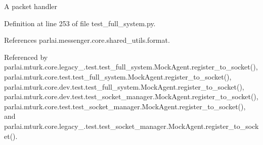 \begin{DoxyVerb}A packet handler\end{DoxyVerb}
 

Definition at line 253 of file test\+\_\+full\+\_\+system.\+py.



References parlai.\+messenger.\+core.\+shared\+\_\+utils.\+format.



Referenced by parlai.\+mturk.\+core.\+legacy\+\_.\+test.\+test\+\_\+full\+\_\+system.\+Mock\+Agent.\+register\+\_\+to\+\_\+socket(), parlai.\+mturk.\+core.\+test.\+test\+\_\+full\+\_\+system.\+Mock\+Agent.\+register\+\_\+to\+\_\+socket(), parlai.\+mturk.\+core.\+dev.\+test.\+test\+\_\+full\+\_\+system.\+Mock\+Agent.\+register\+\_\+to\+\_\+socket(), parlai.\+mturk.\+core.\+dev.\+test.\+test\+\_\+socket\+\_\+manager.\+Mock\+Agent.\+register\+\_\+to\+\_\+socket(), parlai.\+mturk.\+core.\+test.\+test\+\_\+socket\+\_\+manager.\+Mock\+Agent.\+register\+\_\+to\+\_\+socket(), and parlai.\+mturk.\+core.\+legacy\+\_.\+test.\+test\+\_\+socket\+\_\+manager.\+Mock\+Agent.\+register\+\_\+to\+\_\+socket().


